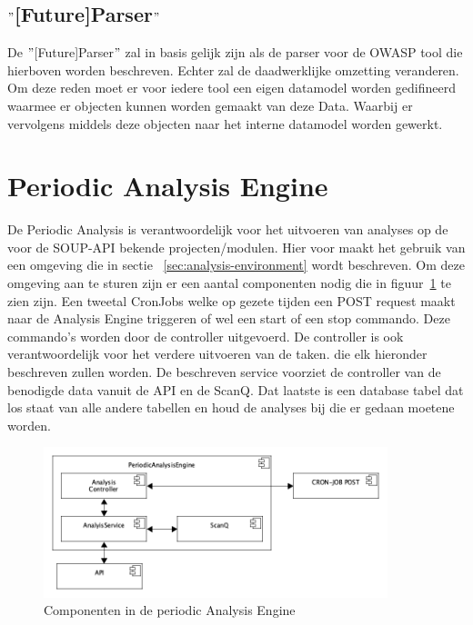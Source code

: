 \subsection{$"$[Future]Parser$"$}\label{subsec:$"$[future]parser$"$}
De $"$[Future]Parser$"$ zal in basis gelijk zijn als de parser voor de OWASP tool die hierboven worden beschreven. Echter zal de daadwerklijke omzetting veranderen. Om deze reden moet er voor iedere tool een eigen datamodel worden gedifineerd waarmee er objecten kunnen worden gemaakt van deze Data. Waarbij er vervolgens middels deze objecten naar het interne datamodel worden gewerkt.

\clearpage


\section{Periodic Analysis Engine}\label{sec:periodiek-analysis-engine}
De Periodic Analysis is verantwoordelijk voor het uitvoeren van analyses op de voor de SOUP-API bekende projecten/modulen. Hier voor maakt het gebruik van een omgeving die in sectie ~\ref{sec:analysis-environment} wordt beschreven. Om deze omgeving aan te sturen zijn er een aantal componenten nodig die in figuur~\ref{fig:paeComps} te zien zijn. Een tweetal CronJobs welke op gezete tijden een POST request maakt naar de Analysis Engine triggeren of wel een start of een stop commando. Deze commando's worden door de controller uitgevoerd. De controller is ook verantwoordelijk voor het verdere uitvoeren van de taken. die elk hieronder beschreven zullen worden. De beschreven service voorziet de controller van de benodigde data vanuit de API en de ScanQ. Dat laatste is een database tabel dat los staat van alle andere tabellen en houd de analyses bij die er gedaan moetene worden.
\begin{figure}[bth]
    \myfloatalign
    \includegraphics[width=10cm]{gfx/umlet/exports/PeriodicAnalyisEngineComponents}
    \caption{Componenten in de periodic Analysis Engine}
    \label{fig:paeComps}
\end{figure}
